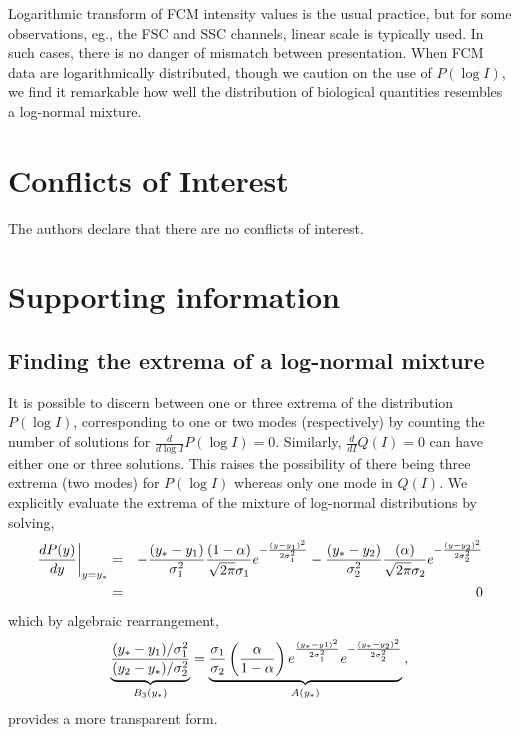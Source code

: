 \documentclass[11pt,a4paper,draft]{article}
\begin{document}
\smallskip 
Logarithmic transform of FCM intensity values is the usual practice, but for some observations, eg., the FSC and SSC channels, linear scale is typically used. In such cases, there is no danger of mismatch between presentation. When FCM data are logarithmically distributed, though we caution on the use of $P(\log I)$, we find it remarkable how well the distribution of biological quantities resembles a log-normal mixture. 

\section*{Conflicts of Interest}
The authors declare that there are no conflicts of interest.


%




\newpage
\section*{Supporting information}
%

\subsection*{Finding the extrema of a log-normal mixture}
It is possible to discern between one or three extrema of the distribution $P(\log I)$, corresponding to one or two modes (respectively) by counting the number of solutions for $\frac{d}{d\log I}P(\log I) = 0$. Similarly, $\frac{d}{dI}Q(I)=0$ can have either one or three solutions. This raises the possibility of there being three extrema (two modes) for $P(\log I)$ whereas only one mode in $Q(I)$. We explicitly evaluate the extrema of the mixture of log-normal distributions by solving,
%
\begin{eqnarray} \nonumber
  \left.\frac{d P(y)}{dy} \right\vert_{y=y_*}&=&
  -\frac{(y_* - y_1)}{\sigma_1^2} \frac{(1-\alpha)}{\sqrt{2\pi}\sigma_1}  \gauss{1}{y_1}{y} -
  \frac{(y_* - y_2)}{\sigma_2^2} \frac{(\alpha)}{\sqrt{2\pi}\sigma_2} \gauss{2}{y_2}{y}\nonumber\\
  &=& 0\nonumber
\end{eqnarray}
%
which by algebraic rearrangement,
%
\begin{equation} 
  \underbrace{\frac{(y_* - y_1) / \sigma_1^2}{(y_2-y_*)/\sigma_2^2}}_{B_3(y_*)} =
    \underbrace{\frac{\sigma_1}{\sigma_2}
    \left(\frac{\alpha}{1-\alpha}\right)
    e^{\frac{(y_*-y1)^2}{2\sigma_1 ^2}}\gauss{2}{y_2}{y_*}}_{A(y_*)}\,,
\label{eq:extremaP}
\end{equation}
%
provides a more transparent form.  
\end{document}
